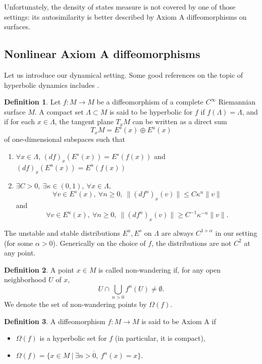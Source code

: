 \documentclass[a4paper]{article}
\theoremstyle{definition}
\newtheorem{definition}{Definition}[section]
\begin{document}
Unfortunately, the density of states measure is not covered by one of those settings: its autosimilarity is better described by Axiom A diffeomorphisms on surfaces.

\subsection{Nonlinear Axiom A diffeomorphisms}

Let us introduce our dynamical setting. Some good references on the topic of hyperbolic dynamics includes \cite{Bo75,KH95,BS02}.  

\begin{definition}\label{def:hyperbolic}
Let $f: M \rightarrow M$ be a diffeomorphism of a complete  $C^\infty$ Riemannian surface $M$. A compact set $\Lambda            \subset M$ is said to be hyperbolic for $f$ if $f(\Lambda) = \Lambda$, and if for each $x \in \Lambda$, the tangent plane $T_xM$ can be written as a direct sum $$ T_xM = E^s(x) \oplus E^u(x) $$
of one-dimensional subspaces such that
\begin{enumerate}
    \item $\forall x\in \Lambda$,  $(df)_x(E^s(x)) = E^s(f(x))$ and $(df)_x(E^u(x)) = E^u(f(x)) $
    \item $\exists C>0, \ \exists \kappa \in (0,1), \ \forall x \in \Lambda, $
    $$ \forall v \in E^s(x), \ \forall n \geq 0,  \ \|(df^n)_x(v)\| \leq C \kappa^n \| v \| $$
    and $$ \forall v \in E^u(x), \ \forall n \geq 0, \  \|(df^n)_x(v)\| \geq C^{-1} \kappa^{-n} \| v \| .$$
\end{enumerate} 
\end{definition}

The unstable and stable distributions $E^u,E^s$ on $\Lambda$ are always $C^{1+\alpha}$ in our setting (for some $\alpha>0$). Generically on the choice of $f$, the distributions are not $C^{2}$ at any point.

\begin{definition}\label{def:NW}
A point $x \in M$ is called non-wandering if, for any open neighborhood $U$ of $x$, $$ U \cap \bigcup_{n > 0} f^n(U)  \neq \emptyset.$$ We denote the set of non-wandering points by $\Omega(f)$.
\end{definition}


\begin{definition}\label{def:AxiomA}
A diffeomorphism $f: M \rightarrow M$ is said to be Axiom A if \begin{itemize}
    \item $\Omega(f)$ is a hyperbolic set for $f$ (in particular, it is compact),
    \item $ \Omega(f) = \overline{\{ x \in M \ | \ \exists n > 0, \ f^n(x) = x  \} } . $
\end{itemize} 
\end{definition}
\end{document}
